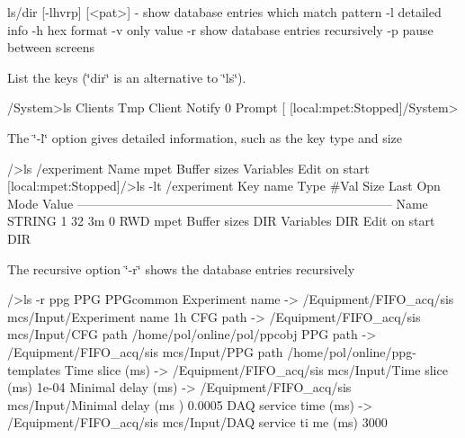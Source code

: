 \begin{DoxyCode}
ls/dir [-lhvrp] [<pat>] - show database entries which match pattern
  -l                      detailed info
  -h                      hex format
  -v                      only value
  -r                      show database entries recursively
  -p                      pause between screens
\end{DoxyCode}
 \par
List the keys (\char`\"{}dir\char`\"{} is an alternative to \char`\"{}ls\char`\"{}). 
\begin{DoxyCode}
/System>ls
Clients
Tmp
Client Notify                   0
Prompt                          [%
[local:mpet:Stopped]/System>     
\end{DoxyCode}
 \par
The \char`\"{}-\/l\char`\"{} option gives detailed information, such as the key type and size 
\begin{DoxyCode}
/>ls /experiment
Name                            mpet
Buffer sizes
Variables
Edit on start
[local:mpet:Stopped]/>ls -lt  /experiment
Key name                        Type    #Val  Size  Last Opn Mode Value
---------------------------------------------------------------------------
Name                            STRING  1     32    3m   0   RWD  mpet
Buffer sizes                    DIR
Variables                       DIR
Edit on start                   DIR
\end{DoxyCode}
 \par
The recursive option \char`\"{}-\/r\char`\"{} shows the database entries recursively 
\begin{DoxyCode}
/>ls -r ppg
PPG
    PPGcommon
        Experiment name -> /Equipment/FIFO_acq/sis mcs/Input/Experiment name
                                1h
        CFG path -> /Equipment/FIFO_acq/sis mcs/Input/CFG path
                                /home/pol/online/pol/ppcobj
        PPG path -> /Equipment/FIFO_acq/sis mcs/Input/PPG path
                                /home/pol/online/ppg-templates
        Time slice (ms) -> /Equipment/FIFO_acq/sis mcs/Input/Time slice (ms)
                                1e-04
        Minimal delay (ms) -> /Equipment/FIFO_acq/sis mcs/Input/Minimal delay (ms
      )
                                0.0005
        DAQ service time (ms) -> /Equipment/FIFO_acq/sis mcs/Input/DAQ service ti
      me (ms)
                                3000
\end{DoxyCode}
 \par
